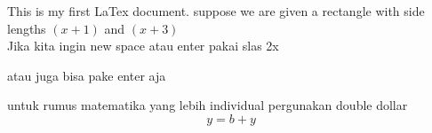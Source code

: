 \documentclass[11pt]{article}
\begin{document}
	This is my first LaTex document. suppose we are given a rectangle with side lengths $(x+1)$ and $(x+3)$
	\\ Jika kita ingin new space atau enter pakai slas 2x
	
	atau juga bisa pake enter aja
	
	untuk rumus matematika yang lebih individual pergunakan double dollar $$ y = b + y$$
\end{document}
